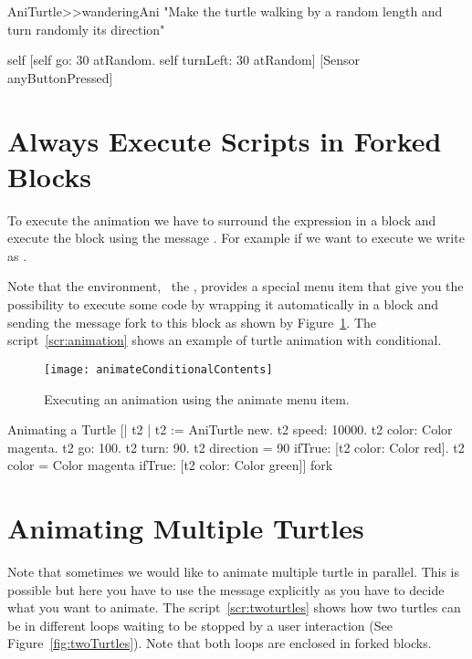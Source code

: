 \begin{method}\label{mth:wanderingani2}
AniTurtle>>wanderingAni
   "Make the turtle walking by a random length and turn randomly its direction"

   self  [self go: 30 atRandom.
      self turnLeft: 30 atRandom]
    [Sensor anyButtonPressed]
\end{method}

\section{Always Execute Scripts in Forked Blocks}

To execute the animation we have to surround the expression in a block and execute the block using the message . For example if we want to execute  we write as .

Note that the environment, \ie\ the \tw, provides a special menu item that give you the possibility to execute some code by wrapping it automatically in a block and sending the message fork to this block as shown by Figure~\ref{fig:animate}. The script~\ref{scr:animation} shows an example of turtle animation with conditional. 

\begin{figure}[h]
\begin{center}
\texttt{[image: animateConditionalContents]}
\caption{Executing an animation using the animate menu item.\label{fig:animate}}
\end{center}
\end{figure}



\begin{scriptwithtitle}{Animating a Turtle}\label{scr:animation}
[| t2 |
t2 := AniTurtle new.
t2 speed: 10000.
t2 color: Color magenta.
t2 go: 100.
t2 turn: 90.
t2 direction = 90
   ifTrue: [t2 color: Color red].
t2 color = Color magenta
   ifTrue: [t2 color: Color green]] fork
\end{scriptwithtitle}




\section{Animating Multiple Turtles}
Note that sometimes we would like to animate multiple turtle in parallel. This is possible but here you have to use the  message explicitly as you have to decide what you want to animate.
The script~\ref{scr:twoturtles} shows how two turtles can be in different loops waiting to be stopped by a user interaction (See Figure~\ref{fig:twoTurtles}). Note that both loops are enclosed in forked blocks.



